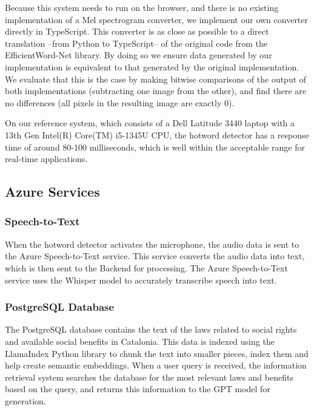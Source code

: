 \documentclass[a4paper,12pt,twoside]{ThesisStyle}
\begin{document}
Because this system needs to run on the browser, and there is no existing implementation of a Mel spectrogram converter, we implement our own converter directly in TypeScript. This converter is as close as possible to a direct translation --from Python to TypeScript-- of the original code from the EfficientWord-Net library. By doing so we ensure data generated by our implementation is equivalent to that generated by the original implementation. We evaluate that this is the case by making bitwise comparisons of the output of both implementations (subtracting one image from the other), and find there are no differences (all pixels in the resulting image are exactly 0).

On our reference system, which consists of a Dell Latitude 3440 laptop with a 13th Gen Intel(R) Core(TM) i5-1345U CPU, the hotword detector has a response time of around 80-100 milliseconds, which is well within the acceptable range for real-time applications.

\subsection{Azure Services}
\label{subsec:azure_services}

\subsubsection{Speech-to-Text}

When the hotword detector activates the microphone, the audio data is sent to the Azure Speech-to-Text service. This service converts the audio data into text, which is then sent to the Backend for processing. The Azure Speech-to-Text service uses the Whisper \cite{Radford2022RobustSpeechRecognitionLargeScale} model to accurately transcribe speech into text.

\subsubsection{PostgreSQL Database}
\label{subsubsec:database}

The PostgreSQL database contains the text of the laws related to social rights and available social benefits in Catalonia. This data is indexed using the LlamaIndex Python library to chunk the text into smaller pieces, index them and  help create semantic embeddings. When a user query is received, the information retrieval system searches the database for the most relevant laws and benefits based on the query, and returns this information to the GPT model for generation.
\end{document}

